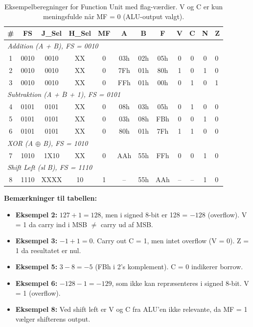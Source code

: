 \documentclass{article}
\begin{document}
\begin{table}[H]
    \centering
    \footnotesize
    \begin{tabular}{c|c|c|c|c|c|c|c|c|c|c|l}
        \textbf{\#} & \textbf{FS} & \textbf{J\_Sel} & \textbf{H\_Sel} & \textbf{MF} & \textbf{A} & \textbf{B} & \textbf{F} & \textbf{V} & \textbf{C} & \textbf{N} & \textbf{Z} \\
        \hline
        \multicolumn{12}{l}{\textit{Addition (A + B), FS = 0010}} \\
        \hline
        1 & 0010 & 0010 & XX & 0 & 03h & 02h & 05h & 0 & 0 & 0 & 0 \\
        2 & 0010 & 0010 & XX & 0 & 7Fh & 01h & 80h & 1 & 0 & 1 & 0 \\
        3 & 0010 & 0010 & XX & 0 & FFh & 01h & 00h & 0 & 1 & 0 & 1 \\
        \hline
        \multicolumn{12}{l}{\textit{Subtraktion (A + $\overline{B}$ + 1), FS = 0101}} \\
        \hline
        4 & 0101 & 0101 & XX & 0 & 08h & 03h & 05h & 0 & 1 & 0 & 0 \\
        5 & 0101 & 0101 & XX & 0 & 03h & 08h & FBh & 0 & 0 & 1 & 0 \\
        6 & 0101 & 0101 & XX & 0 & 80h & 01h & 7Fh & 1 & 1 & 0 & 0 \\
        \hline
        \multicolumn{12}{l}{\textit{XOR (A $\oplus$ B), FS = 1010}} \\
        \hline
        7 & 1010 & 1X10 & XX & 0 & AAh & 55h & FFh & 0 & 0 & 1 & 0 \\
        \hline
        \multicolumn{12}{l}{\textit{Shift Left (sl B), FS = 1110}} \\
        \hline
        8 & 1110 & XXXX & 10 & 1 & --  & 55h & AAh & -- & -- & 1 & 0 \\
    \end{tabular}
    \caption{Eksempelberegninger for Function Unit med flag-værdier. V og C er kun meningsfulde når MF = 0 (ALU-output valgt).}
    \label{tab:fu-examples}
\end{table}

\noindent
\textbf{Bemærkninger til tabellen:}
\begin{itemize}
    \item \textbf{Eksempel 2:} $127 + 1 = 128$, men i signed 8-bit er 128 = $-128$ (overflow). V = 1 da carry ind i MSB $\neq$ carry ud af MSB.
    \item \textbf{Eksempel 3:} $-1 + 1 = 0$. Carry out C = 1, men intet overflow (V = 0). Z = 1 da resultatet er nul.
    \item \textbf{Eksempel 5:} $3 - 8 = -5$ (FBh i 2's komplement). C = 0 indikerer borrow.
    \item \textbf{Eksempel 6:} $-128 - 1 = -129$, som ikke kan repræsenteres i signed 8-bit. V = 1 (overflow).
    \item \textbf{Eksempel 8:} Ved shift left er V og C fra ALU'en ikke relevante, da MF = 1 vælger shifterens output.
\end{itemize}
\end{document}
